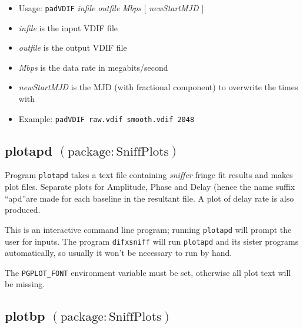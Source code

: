 \begin{itemize}
\item[] Usage: {\tt padVDIF} {\em infile} {\em outfile} {\em Mbps} $[$ {\em newStartMJD} $]$

\item[] {\em infile} is the input VDIF file
\item[] {\em outfile} is the output VDIF file
\item[] {\em Mbps} is the data rate in megabits/second
\item[] {\em newStartMJD} is the MJD (with fractional component) to overwrite the times with

\item[] Example: {\tt padVDIF raw.vdif smooth.vdif 2048}
\end{itemize}










\subsection{plotapd {\small $\mathrm{(package: SniffPlots)}$} \label{sec:plotapd}}

Program {\tt plotapd} takes a text file containing {\em sniffer} fringe fit results and makes plot files.
Separate plots for Amplitude, Phase and Delay (hence the name suffix ``apd''are made for each baseline in the resultant file.
A plot of delay rate is also produced.

This is an interactive command line program; running {\tt plotapd} will prompt the user for inputs.
The program {\tt difxsniff} will run {\tt plotapd} and its sister programs automatically, so usually it won't be necessary to run by hand.

The {\tt PGPLOT\_FONT} environment variable must be set, otherwise all plot text will be missing.






\subsection{plotbp {\small $\mathrm{(package: SniffPlots)}$} \label{sec:plotbp}}

